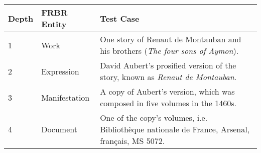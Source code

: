 \begin{center}
    \begin{tabular}
        {|p{}|p{}|p{}|}
        \hline
        \textbf{Depth} & \textbf{FRBR Entity} & \textbf{Test Case} \\
        \hline
        1 & Work & One story of Renaut de Montauban and his brothers (\textit{The four sons of Aymon}).\\
        \hline
        2 & Expression & David Aubert’s prosified version of the story, known as \textit{Renaut de Montauban}.\\
        \hline
        3 & Manifestation & A copy of Aubert’s version, which was composed in five volumes in the 1460s.\\
        \hline
        4 & Document & One of the copy's volumes, i.e. Bibliothèque nationale de France, Arsenal, français, MS 5072.\\
        \hline
    \end{tabular}
\end{center}